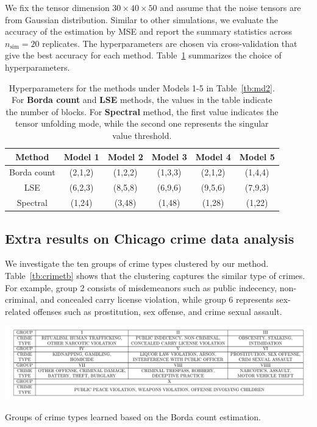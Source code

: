 \documentclass[12pt]{article}
\theoremstyle{definition}
\begin{document}
We fix the tensor dimension ${30\times40\times 50}$ and assume that the noise tensors are from Gaussian distribution. Similar to other simulations, we evaluate the accuracy of the estimation by MSE and report the summary statistics across $n_{\text{sim}} = 20$ replicates. The hyperparameters are chosen via cross-validation that give the best accuracy for each method. Table~\ref{tb:hyper} summarizes the choice of hyperparameters.

\begin{table}[ht]
    \centering
    \begin{tabular}{c|c|c|c|c|c}
        Method &  Model 1 & Model 2 & Model 3& Model 4 & Model 5  \\\hline
        Borda count &   (2,1,2)&(1,2,2)& (1,3,3) &(2,1,2)&(1,4,4)\\
        LSE &(6,2,3)&(8,5,8)&(6,9,6)&(9,5,6)&(7,9,3)\\
        Spectral & (1,24)&(3,48)&(1,48)&(1,28)&(1,22)
    \end{tabular}
    \caption{Hyperparameters for the methods under Models 1-5 in Table~\ref{tb:md2}. For {\bf \small Borda count} and {\bf \small LSE} methods, the values in the table indicate the number of blocks. For {\bf \small Spectral} method, the first value indicates the tensor unfolding mode, while the second one represents the singular value threshold.}
    \label{tb:hyper}
\end{table}

\subsection{Extra results on Chicago crime data analysis}\label{subsec:chicago}
We investigate the ten groups of crime types clustered by our method. Table~\ref{tb:crimetb} shows that the clustering captures the similar type of crimes. For example, group 2 consists of misdemeanors such as public indecency, non-criminal, and concealed carry license violation, while group 6 represents sex-related offenses such as prostitution, sex offense, and crime sexual assault.

\begin{table}[ht!]
    \centering
    \includegraphics[width = \textwidth]{figure/crimetable.pdf}
    \caption{Groups of crime types learned based on the Borda count estimation.}
    \label{tb:crimetb}
\end{table}
\end{document}
